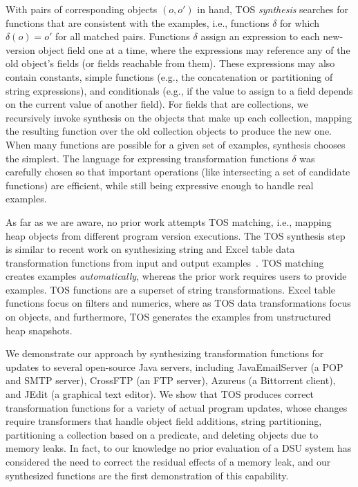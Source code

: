 \documentclass[natbib]{sigplanconf}
\newcommand{\TOS}{TOS\xspace}
\begin{document}
With pairs of corresponding objects $(o,o')$ in hand, \TOS
\emph{synthesis} searches for functions that are consistent with the
examples, i.e., functions $\delta$ for which $\delta(o) = o'$ for all
matched pairs.  Functions $\delta$ assign an expression to each
new-version object field one at a time, where the expressions may
reference any of the old object's fields (or fields reachable from
them).  These expressions may also contain constants, simple functions
(e.g., the concatenation or partitioning of string expressions), and
conditionals (e.g., if the value to assign to a field depends on the
current value of another field).  For fields that are collections, we
recursively invoke synthesis on the objects that make up each
collection, mapping the resulting function over the old collection
objects to produce the new one.  When many functions are possible for
a given set of examples, synthesis chooses the simplest.  The language
for expressing transformation functions $\delta$ was carefully chosen so that
important operations (like intersecting a set of candidate functions)
are efficient, while still being expressive enough to handle real
examples.


As far as we are aware, no prior work attempts \TOS matching, i.e.,
mapping heap objects from different program version executions.  The
\TOS synthesis step is similar to recent work on synthesizing string
and Excel table data transformation functions from input and output
examples~\cite{Gulwani:popl:2011,Gulwani:pldi:2011}.  \TOS matching
creates examples \emph{automatically}, whereas the prior work requires
users to provide examples.  \TOS functions are a superset of string
transformations. Excel table functions focus on filters and numerics,
where as \TOS data transformations focus on objects, and furthermore,
\TOS generates the examples from unstructured heap snapshots.


We demonstrate our approach by synthesizing transformation functions
for updates to several open-source Java servers, including
JavaEmailServer (a POP and SMTP server), CrossFTP (an FTP server),
Azureus (a Bittorrent client), and JEdit (a graphical text
editor). We show that \TOS
produces correct transformation functions for a variety of actual program
updates, whose changes require transformers that handle object field
additions, string partitioning, partitioning a collection based on a
predicate, and deleting objects due to memory leaks.  In fact, to our
knowledge no prior evaluation of a DSU system has considered the need
to correct the residual effects of a memory leak, and our synthesized
functions are the first demonstration of this capability.
\end{document}

